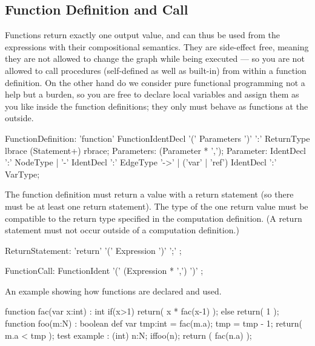 \subsection{Function Definition and Call}\label{sub:functions}\label{sec:funccall} 

Functions return exactly one output value, and can thus be used from the expressions with their compositional semantics.
They are side-effect free, meaning they are not allowed to change the graph while being executed ---
so you are not allowed to call procedures (self-defined as well as built-in) from within a function definition.
On the other hand do we consider pure functional programming not a help but a burden, so you are free to declare local variables and assign them as you like inside the function definitions; they only must behave as functions at the outside.

\begin{rail} 
  FunctionDefinition: 
	'function' FunctionIdentDecl '(' Parameters ')' ':' ReturnType\\
	lbrace (Statement+) rbrace;
  Parameters: (Parameter * ',');
  Parameter: IdentDecl ':' NodeType |
  '-' IdentDecl ':' EdgeType '->' |
  ('var' | 'ref') IdentDecl ':' VarType;
\end{rail}

The function definition must return a value with a return statement (so there must be at least one return statement).
The type of the one return value must be compatible to the return type specified in the computation definition.
(A return statement must not occur outside of a computation definition.)

\begin{rail}
  ReturnStatement: 'return' '(' Expression ')' ';' ;
\end{rail}

\begin{rail}
  FunctionCall: FunctionIdent '(' (Expression * ',') ')' ;
\end{rail}

\begin{example}
An example showing how functions are declared and used.
  \begin{grgen}
function fac(var x:int) : int
{
	if(x>1) {
		return( x * fac(x-1) );
	} else {
		return( 1 );
	}
}
function foo(m:N) : boolean
{
	def var tmp:int = fac(m.a);
	tmp = tmp - 1;
	return( m.a < tmp );
}
test example : (int)
{
	n:N;
	if{foo(n);}
	return ( fac(n.a) );
}
  \end{grgen}
\end{example}

